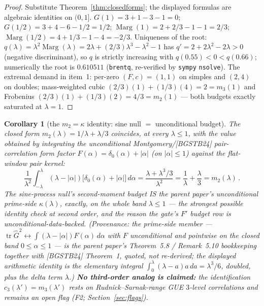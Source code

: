 \documentclass[11pt]{article}
\theoremstyle{plain}
\newtheorem{corollary}[theorem]{Corollary}
\theoremstyle{definition}
\theoremstyle{remark}
\newcommand{\Gh}{\widehat{G}}
\newcommand{\tr}{\operatorname{tr}}
\newcommand{\Marg}{\operatorname{Marg}}
\begin{document}
\begin{proof}
Substitute Theorem~\ref{thm:closedforms}; the displayed formulas are algebraic
identities on $(0, 1]$. $G(1) = 3 + 1 - 3 - 1 = 0$;
$G(1/2) = 3 + 4 - 6 - 1/2 = 1/2$; $\Marg(1) = 2 + 2/3 - 1 - 1 = 2/3$;
$\Marg(1/2) = 4 + 1/3 - 1 - 4 = -2/3$. Uniqueness of the root:
$q(\lambda) = \lambda^2 \Marg(\lambda)
= 2\lambda + (2/3)\lambda^3 - \lambda^2 - 1$ has
$q' = 2 + 2\lambda^2 - 2\lambda > 0$ (negative discriminant), so $q$ is strictly
increasing with $q(0.55) < 0 < q(0.66)$; numerically the root is $0.610511$
(\texttt{brentq}, re-verified by \texttt{sympy} \texttt{nsolve}). The extremal
demand in item~1: per-zero $(F, c) = (1, 1)$ on simples and $(2, 4)$ on doubles;
mass-weighted cubic $(2/3)(1) + (1/3)(4) = 2 = m_3(1)$ and Frobenius
$(2/3)(1) + (1/3)(2) = 4/3 = m_2(1)$ --- both budgets exactly saturated at
$\lambda = 1$.
\end{proof}

\begin{corollary}[the $m_2 = \kappa$ identity: sine null $=$ unconditional budget]
\label{cor:m2kappa}
The closed form $m_2(\lambda) = 1/\lambda + \lambda/3$ coincides, at every
$\lambda \le 1$, with the value obtained by integrating the unconditional
Montgomery/[BGSTB24] pair-correlation form factor
$F(\alpha) = \delta_0(\alpha) + |\alpha|$ (on $|\alpha| \le 1$) against the
flat-window pair kernel:
\[
  \frac{1}{\lambda^2} \int_{-\lambda}^{\lambda} (\lambda - |\alpha|)
    \bigl[ \delta_0(\alpha) + |\alpha| \bigr]\, d\alpha
  = \frac{\lambda + \lambda^3/3}{\lambda^2}
  = \frac{1}{\lambda} + \frac{\lambda}{3}
  = m_2(\lambda) \,.
\]
The sine-process null's second-moment budget IS the parent paper's unconditional
prime-side $\kappa(\lambda)$, exactly, on the whole band $\lambda \le 1$ --- the
strongest possible identity check at second order, and the reason the gate's $F'$
budget row is unconditional-data-backed. (Provenance: the prime-side member ---
$\tr \Gh^2 \leftrightarrow \int (\lambda - |\alpha|) F(\alpha)\, d\alpha$ with
$F$ unconditional and pointwise on the closed band $0 \le \alpha \le 1$ --- is the
parent paper's Theorem~5.8 / Remark~5.10 bookkeeping together with [BGSTB24]
Theorem~1, quoted, not re-derived; the displayed arithmetic identity is the
elementary integral $\int_0^\lambda (\lambda - a) a\, da = \lambda^3/6$, doubled,
plus the delta term $\lambda$.) \textbf{No third-order analog is claimed:} the
identification $c_3(\lambda') = m_3(\lambda')$ rests on Rudnick--Sarnak-range GUE
$3$-level correlations and remains an open flag (F2;
Section~\ref{sec:flags}).
\end{corollary}
\end{document}
